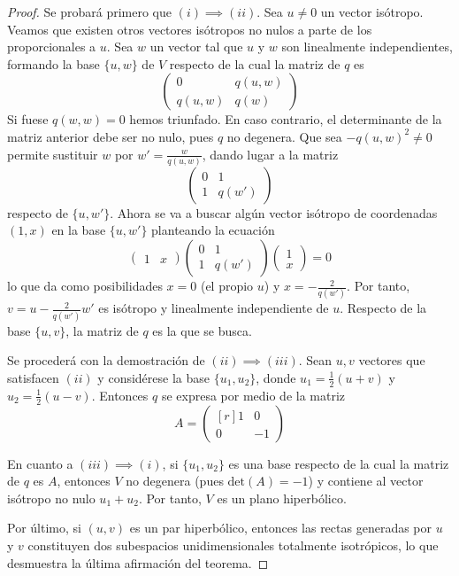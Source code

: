 \documentclass[12pt]{report}
\theoremstyle{definition}
\theoremstyle{definition}
\theoremstyle{remark}
\begin{document}
\begin{proof}
Se probará primero que $(i) \implies (ii)$. Sea $u \neq 0$ un vector isótropo. Veamos que existen otros vectores isótropos no nulos a parte de los proporcionales a $u$. Sea $w$ un vector tal que $u$ y $w$ son linealmente independientes, formando la base $\{u,w\}$ de $V$ respecto de la cual la matriz de $q$ es
\[\begin{pmatrix*}
    0 & q(u,w) \\
    q(u,w) & q(w)
\end{pmatrix*}\]
Si fuese $q(w,w) = 0$ hemos triunfado. En caso contrario, el determinante de la matriz anterior debe ser no nulo, pues $q$ no degenera. Que sea $-q(u,w)^2 \neq 0$ permite sustituir $w$ por $w' =\frac{w}{q(u,w)}$, dando lugar a la matriz
\[\begin{pmatrix*}
    0 & 1 \\
    1 & q(w')
\end{pmatrix*}\]
respecto de $\{u,w'\}$. Ahora se va a buscar algún vector isótropo de coordenadas $(1,x)$ en la base $\{u,w'\}$ planteando la ecuación
\[\begin{pmatrix*}
    1 & x
\end{pmatrix*} \begin{pmatrix*}
    0 & 1 \\
    1 & q(w')
\end{pmatrix*} \begin{pmatrix*}
    1 \\
    x
\end{pmatrix*}=0
\]
lo que da como posibilidades $x = 0$ (el propio $u$) y $x = -\frac{2}{q(w')}$. Por tanto, $v = u -\frac{2}{q(w')}w'$ es isótropo y linealmente independiente de $u$. Respecto de la base $\{u,v\}$, la matriz de $q$ es la que se busca.

\vspace{2mm}
Se procederá con la demostración de $(ii) \implies (iii)$. Sean $u, v$ vectores que satisfacen $(ii)$ y considérese la base $\{u_1,u_2\}$, donde $u_1 = \frac{1}{2}(u+v)$ y $u_2=\frac{1}{2}(u-v)$. Entonces $q$ se expresa por medio de la matriz
\[A = \begin{pmatrix*}[r]
    1 & 0 \\
    0 & -1
\end{pmatrix*}\]

En cuanto a $(iii) \implies (i)$, si $\{u_1,u_2\}$ es una base respecto de la cual la matriz de $q$ es $A$, entonces $V$ no degenera (pues $\textrm{det}(A) = -1$) y contiene al vector isótropo no nulo $u_1+u_2$. Por tanto, $V$ es un plano hiperbólico.

\vspace{2mm}
Por último, si $(u,v)$ es un par hiperbólico, entonces las rectas generadas por $u$ y $v$ constituyen dos subespacios unidimensionales totalmente isotrópicos, lo que desmuestra la última afirmación del teorema.

\end{proof}
\end{document}
